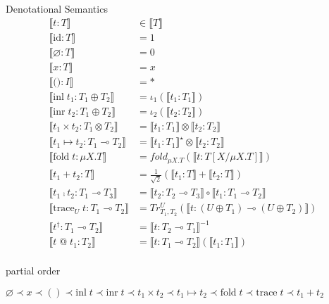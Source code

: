 \documentclass[10pt]{jsarticle}
\newcommand{\semantics}[1]{{\llbracket #1 \rrbracket}}
\begin{document}
\begin{itembox}[c]{Denotational Semantics}
  \begin{align*}
    \semantics{t:T}                                 &\in \semantics{T} \\
    \semantics{\text{id}:T}                         &= 1 \\
    \semantics{\varnothing:T}                       &= 0 \\ %
    \semantics{x:T}                                 &= x \\
    \semantics{\text{()}:I}                         &= \ast \\
    \semantics{\text{inl}\;t_1:T_1\oplus{}T_2}      &= \iota_1(\semantics{t_1:T_1}) \\
    \semantics{\text{inr}\;t_2:T_1\oplus{}T_2}      &= \iota_2(\semantics{t_2:T_2}) \\
    \semantics{t_1\times{}t_2:T_1\otimes{}T_2}      &= \semantics{t_1:T_1}\otimes\semantics{t_2:T_2} \\
    \semantics{t_1\mapsto{}t_2:T_1\multimap{}T_2}   &= \semantics{t_1:T_1}^\star\otimes\semantics{t_2:T_2} \\
    \semantics{\text{fold}\;t:\mu{X}.T}             &= fold_{\mu{X}.T}(\semantics{t:T[X/\mu{X}.T]}) \\
    \semantics{t_1+t_2:T}                           &= \tfrac{1}{\sqrt{2}}(\semantics{t_1:T}+\semantics{t_2:T}) \\
    \semantics{t_1\fcmp{}t_2:T_1\multimap{}T_3}     &= \semantics{t_2:T_2\multimap{}T_3}\circ\semantics{t_1:T_1\multimap{}T_2} \\
    \semantics{\text{trace}_U\;t:T_1\multimap{}T_2} &= Tr_{T_1,T_2}^U(\semantics{t:(U\oplus{}T_1)\multimap(U\oplus{}T_2)}) \\
    \semantics{t^\dagger:T_1\multimap{}T_2}         &= \semantics{t:T_2\multimap{}T_1}^{-1} \\
    \semantics{t\;\text{@}\;t_1:T_2}                &= \semantics{t:T_1\multimap{}T_2}(\semantics{t_1:T_1}) \\
  \end{align*}
\end{itembox}

\begin{itembox}[c]{partial order}
  \begin{center}
    $ \varnothing \prec x \prec () \prec \text{inl}\;t \prec \text{inr}\;t \prec t_1\times{}t_2 \prec t_1\mapsto{}t_2 \prec \text{fold}\;t \prec \text{trace}\;t  \prec t_1+t_2 $
  \end{center}
\end{itembox}
\end{document}
